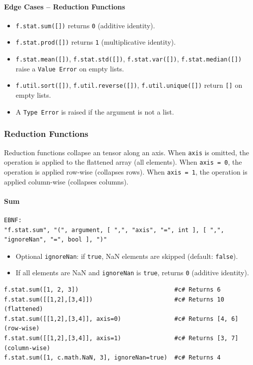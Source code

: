 \paragraph{Edge Cases -- Reduction Functions}
\begin{itemize}
\item \texttt{f.stat.sum([])} returns \texttt{0} (additive identity).
\item \texttt{f.stat.prod([])} returns \texttt{1} (multiplicative identity).
\item \texttt{f.stat.mean([])}, \texttt{f.stat.std([])}, \texttt{f.stat.var([])}, \texttt{f.stat.median([])} raise a \texttt{Value Error} on empty lists.
\item \texttt{f.util.sort([])}, \texttt{f.util.reverse([])}, \texttt{f.util.unique([])} return \texttt{[]} on empty lists.
\item A \texttt{Type Error} is raised if the argument is not a list.
\end{itemize}

\subsubsection{Reduction Functions}
Reduction functions collapse an tensor along an axis. When \texttt{axis} is omitted, the operation is applied to the flattened array (all elements). When \texttt{axis = 0}, the operation is applied row-wise (collapses rows). When \texttt{axis = 1}, the operation is applied column-wise (collapses columns).

\paragraph{Sum}
\begin{verbatim}
EBNF:
"f.stat.sum", "(", argument, [ ",", "axis", "=", int ], [ ",", "ignoreNan", "=", bool ], ")"
\end{verbatim}
\begin{itemize}
\item Optional \texttt{ignoreNan}: if \texttt{true}, NaN elements are skipped (default: \texttt{false}).
\item If all elements are NaN and \texttt{ignoreNan} is \texttt{true}, returns \texttt{0} (additive identity).
\end{itemize}
\begin{verbatim}
f.stat.sum([1, 2, 3])                           #c# Returns 6
f.stat.sum([[1,2],[3,4]])                       #c# Returns 10 (flattened)
f.stat.sum([[1,2],[3,4]], axis=0)               #c# Returns [4, 6]  (row-wise)
f.stat.sum([[1,2],[3,4]], axis=1)               #c# Returns [3, 7]  (column-wise)
f.stat.sum([1, c.math.NaN, 3], ignoreNan=true)  #c# Returns 4
\end{verbatim}


